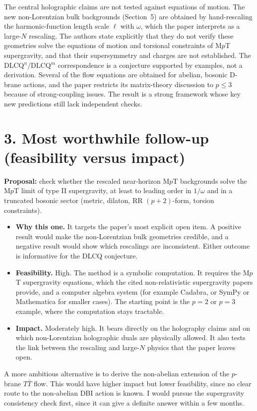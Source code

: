 \documentclass[11pt]{article}
\begin{document}
The central holographic claims are not tested against equations of motion. The new non-Lorentzian bulk backgrounds (Section~5) are obtained by hand-rescaling the harmonic-function length scale $\ell$ with $\omega$, which the paper interprets as a large-$N$ rescaling. The authors state explicitly that they do not verify these geometries solve the equations of motion and torsional constraints of M$p$T supergravity, and that their supersymmetry and charges are not established. The DLCQ$^n$/DLCQ$^m$ correspondence is a conjecture supported by examples, not a derivation. Several of the flow equations are obtained for abelian, bosonic D-brane actions, and the paper restricts its matrix-theory discussion to $p\le 3$ because of strong-coupling issues. The result is a strong framework whose key new predictions still lack independent checks.

\section*{3. Most worthwhile follow-up (feasibility versus impact)}

\textbf{Proposal:} check whether the rescaled near-horizon M$p$T backgrounds solve the M$p$T limit of type II supergravity, at least to leading order in $1/\omega$ and in a truncated bosonic sector (metric, dilaton, RR $(p+2)$-form, torsion constraints).

\begin{itemize}
  \item \textbf{Why this one.} It targets the paper's most explicit open item. A positive result would make the non-Lorentzian bulk geometries credible, and a negative result would show which rescalings are inconsistent. Either outcome is informative for the DLCQ conjecture.
  \item \textbf{Feasibility.} High. The method is a symbolic computation. It requires the M$p$T supergravity equations, which the cited non-relativistic supergravity papers provide, and a computer algebra system (for example Cadabra, or SymPy or Mathematica for smaller cases). The starting point is the $p=2$ or $p=3$ example, where the computation stays tractable.
  \item \textbf{Impact.} Moderately high. It bears directly on the holography claims and on which non-Lorentzian holographic duals are physically allowed. It also tests the link between the rescaling and large-$N$ physics that the paper leaves open.
\end{itemize}

A more ambitious alternative is to derive the non-abelian extension of the $p$-brane $T\bar T$ flow. This would have higher impact but lower feasibility, since no clear route to the non-abelian DBI action is known. I would pursue the supergravity consistency check first, since it can give a definite answer within a few months.
\end{document}
